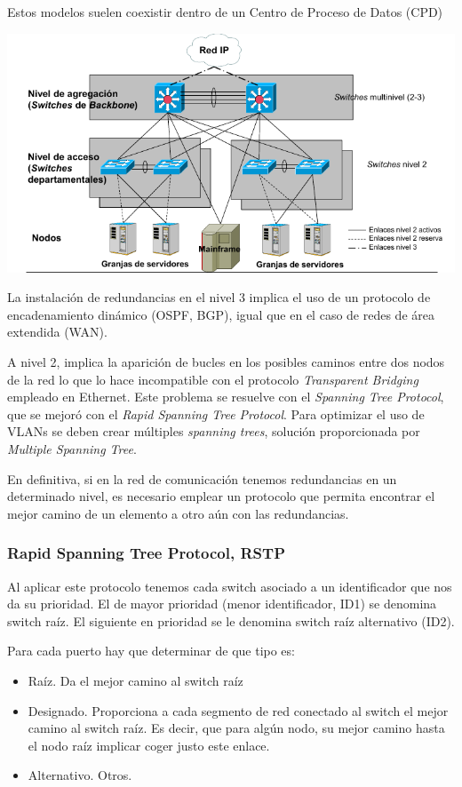 Estos modelos suelen coexistir dentro de un Centro de Proceso de Datos (CPD)
\begin{center}
\includegraphics[width=\linewidth]{img/niveles.png}
\end{center}

La instalación de redundancias en el nivel 3 implica el uso de un protocolo de encadenamiento dinámico (OSPF, BGP), igual que en el caso de redes de área extendida (WAN).

A nivel 2, implica la aparición de bucles en los posibles caminos entre dos nodos de la red lo que lo hace incompatible con el protocolo \textit{Transparent Bridging} empleado en Ethernet. Este problema se resuelve con el \textit{Spanning Tree Protocol}, que se mejoró con el \textit{Rapid Spanning Tree Protocol}. Para optimizar el uso de VLANs se deben crear múltiples \textit{spanning trees}, solución proporcionada por \textit{Multiple Spanning Tree}.

En definitiva, si en la red de comunicación tenemos redundancias en un determinado nivel, es necesario emplear un protocolo que permita encontrar el mejor camino de un elemento a otro aún con las redundancias.

\subsubsection{Rapid Spanning Tree Protocol, RSTP}

Al aplicar este protocolo tenemos cada switch asociado a un identificador que nos da su prioridad. El de mayor prioridad (menor identificador, ID1) se denomina switch raíz. El siguiente en prioridad se le denomina switch raíz alternativo (ID2).

Para cada puerto hay que determinar de que tipo es:
\begin{itemize}
\item Raíz. Da el mejor camino al switch raíz

\item Designado. Proporciona a cada segmento de red conectado al switch el mejor camino al switch raíz. Es decir, que para algún nodo, su mejor camino hasta el nodo raíz implicar coger justo este enlace.

\item Alternativo. Otros.
\end{itemize}

